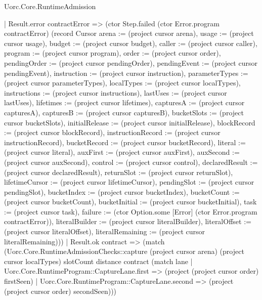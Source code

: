 \begin{lexlean}{Uorc.Core.RuntimeAdmission}
\begin{semanticmodule}
{                | Result.error contractError => (ctor Step.failed (ctor Error.program contractError) (record Cursor {arena := (project cursor arena), usage := (project cursor usage), budget := (project cursor budget), caller := (project cursor caller), program := (project cursor program), order := (project cursor order), pendingOrder := (project cursor pendingOrder), pendingEvent := (project cursor pendingEvent), instruction := (project cursor instruction), parameterTypes := (project cursor parameterTypes), localTypes := (project cursor localTypes), instructions := (project cursor instructions), lastUses := (project cursor lastUses), lifetimes := (project cursor lifetimes), capturesA := (project cursor capturesA), capturesB := (project cursor capturesB), bucketSlots := (project cursor bucketSlots), initialRelease := (project cursor initialRelease), blockRecord := (project cursor blockRecord), instructionRecord := (project cursor instructionRecord), bucketRecord := (project cursor bucketRecord), literal := (project cursor literal), auxFirst := (project cursor auxFirst), auxSecond := (project cursor auxSecond), control := (project cursor control), declaredResult := (project cursor declaredResult), returnSlot := (project cursor returnSlot), lifetimeCursor := (project cursor lifetimeCursor), pendingSlot := (project cursor pendingSlot), bucketIndex := (project cursor bucketIndex), bucketCount := (project cursor bucketCount), bucketInitial := (project cursor bucketInitial), task := (project cursor task), failure := (ctor Option.some [Error] (ctor Error.program contractError)), literalBuilder := (project cursor literalBuilder), literalOffset := (project cursor literalOffset), literalRemaining := (project cursor literalRemaining)}))
                | Result.ok contract => (match (Uorc.Core.RuntimeAdmissionChecks::capture (project cursor arena) (project cursor localTypes) slotCount distance contract (match lane
                    | Uorc.Core.RuntimeProgram::CaptureLane.first => (project (project cursor order) firstSeen)
                    | Uorc.Core.RuntimeProgram::CaptureLane.second => (project (project cursor order) secondSeen)))
}
\end{semanticmodule}
\end{lexlean}
